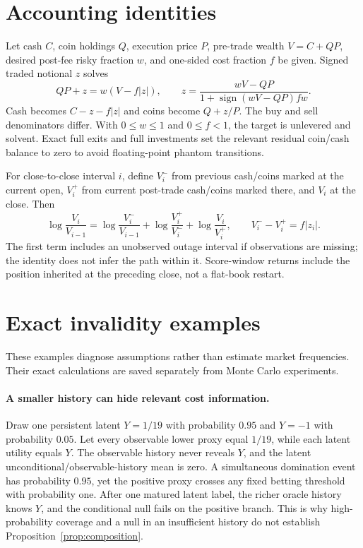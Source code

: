 \section{Accounting identities}

Let cash $C$, coin holdings $Q$, execution price $P$, pre-trade wealth
$V=C+QP$, desired post-fee risky fraction $w$, and one-sided cost fraction $f$
be given. Signed traded notional $z$ solves
\[
 QP+z=w(V-f|z|),\qquad
 z=\frac{wV-QP}{1+\operatorname{sign}(wV-QP)fw}.
\]
Cash becomes $C-z-f|z|$ and coins become $Q+z/P$. The buy and sell
denominators differ. With $0\leq w\leq1$ and $0\leq f<1$, the target
is unlevered and solvent. Exact full exits and full investments set the relevant
residual coin/cash balance to zero to avoid floating-point phantom transitions.

For close-to-close interval $i$, define $V^-_i$ from previous cash/coins marked
at the current open, $V^+_i$ from current post-trade cash/coins marked there, and
$V_i$ at the close. Then
\[
 \log\frac{V_i}{V_{i-1}}=
 \log\frac{V^-_i}{V_{i-1}}+
 \log\frac{V^+_i}{V^-_i}+
 \log\frac{V_i}{V^+_i},\qquad
 V^-_i-V^+_i=f|z_i|.
\]
The first term includes an unobserved outage interval if observations are
missing; the identity does not infer the path within it. Score-window returns
include the position inherited at the preceding close, not a flat-book restart.

\section{Exact invalidity examples}
\label{app:counterexamples}

These examples diagnose assumptions rather than estimate market frequencies.
Their exact calculations are saved separately from Monte Carlo experiments.

\paragraph{A smaller history can hide relevant cost information.}
Draw one persistent latent $Y=1/19$ with probability $0.95$ and $Y=-1$ with
probability $0.05$. Let every observable lower proxy equal $1/19$, while each
latent utility equals $Y$. The observable history never reveals $Y$, and the
latent unconditional/observable-history mean is zero. A simultaneous domination
event has probability $0.95$, yet the positive proxy crosses any fixed betting
threshold with probability one. After one matured latent label, the richer
oracle history knows $Y$, and the conditional null fails on the positive branch.
This is why high-probability coverage and a null in an insufficient history do
not establish Proposition~\ref{prop:composition}.

